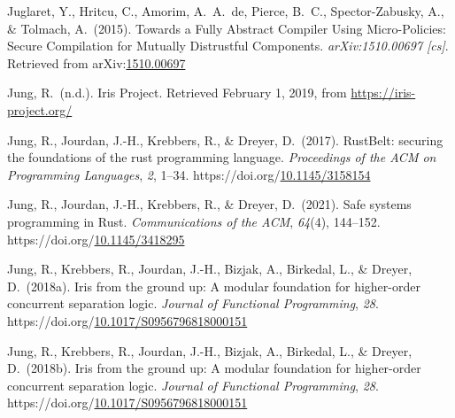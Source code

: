 \documentclass[12pt,twoside]{article}
\begin{document}
{\begin{thebibliography}{1079}
\mdbibitemlabel{}Juglaret, Y., Hritcu, C., Amorim, A.~A.~de, Pierce, B.~C., Spector-Zabusky, A., \& Tolmach, A.~(2015). Towards a Fully Abstract Compiler Using Micro-Policies: Secure Compilation for Mutually Distrustful Components. \emph{arXiv:1510.00697 {}[cs]}. Retrieved from arXiv:\href{http://arxiv.org/abs/1510.00697}{1510.00697}%

\mdbibitemlabel{}Jung, R.~(n.d.). Iris Project. Retrieved February 1, 2019, from \href{https://iris-project.org/}{{\ttfamily https://\hspace{0pt}iris-\hspace{0pt}project.\hspace{0pt}org/\hspace{0pt}}}%

\mdbibitemlabel{}Jung, R., Jourdan, J.-H., Krebbers, R., \& Dreyer, D.~(2017). RustBelt: securing the foundations of the rust programming language. \emph{Proceedings of the ACM on Programming Languages}, \emph{2}, 1–34. https://doi.org/\href{https://dx.doi.org/10.1145/3158154}{10.1145/3158154}%

\mdbibitemlabel{}Jung, R., Jourdan, J.-H., Krebbers, R., \& Dreyer, D.~(2021). Safe systems programming in Rust. \emph{Communications of the ACM}, \emph{64}(4), 144–152. https://doi.org/\href{https://dx.doi.org/10.1145/3418295}{10.1145/3418295}%

\mdbibitemlabel{}Jung, R., Krebbers, R., Jourdan, J.-H., Bizjak, A., Birkedal, L., \& Dreyer, D.~(2018a). Iris from the ground up: A modular foundation for higher-order concurrent separation logic. \emph{Journal of Functional Programming}, \emph{28}. https://doi.org/\href{https://dx.doi.org/10.1017/S0956796818000151}{10.1017/S0956796818000151}%

\mdbibitemlabel{}Jung, R., Krebbers, R., Jourdan, J.-H., Bizjak, A., Birkedal, L., \& Dreyer, D.~(2018b). Iris from the ground up: A modular foundation for higher-order concurrent separation logic. \emph{Journal of Functional Programming}, \emph{28}. https://doi.org/\href{https://dx.doi.org/10.1017/S0956796818000151}{10.1017/S0956796818000151}%


\end{thebibliography}}
\end{document}
